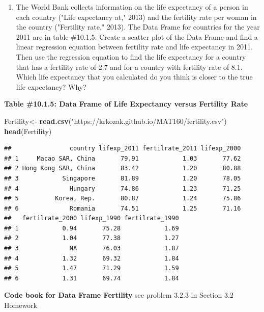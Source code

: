 \documentclass[]{book}
\newenvironment{Shaded}{\begin{snugshade}}{\end{snugshade}}
\newcommand{\KeywordTok}[1]{\textcolor[rgb]{0.13,0.29,0.53}{\textbf{#1}}}
\newcommand{\NormalTok}[1]{#1}
\newcommand{\StringTok}[1]{\textcolor[rgb]{0.31,0.60,0.02}{#1}}
\providecommand{\tightlist}{%
  \setlength{\itemsep}{0pt}\setlength{\parskip}{0pt}}
\begin{document}
\begin{enumerate}
\def\labelenumi{\arabic{enumi}.}
\setcounter{enumi}{2}
\tightlist
\item
  The World Bank collects information on the life expectancy of a person in each country ("Life expectancy at," 2013) and the fertility rate per woman in the country ("Fertility rate," 2013). The Data Frame for countries for the year 2011 are in table \#10.1.5. Create a scatter plot of the Data Frame and find a linear regression equation between fertility rate and life expectancy in 2011. Then use the regression equation to find the life expectancy for a country that has a fertility rate of 2.7 and for a country with fertility rate of 8.1. Which life expectancy that you calculated do you think is closer to the true life expectancy? Why?
\end{enumerate}

\textbf{Table \#10.1.5: Data Frame of Life Expectancy versus Fertility Rate}

\begin{Shaded}
\begin{Highlighting}[]
\NormalTok{Fertility<-}\StringTok{ }\KeywordTok{read.csv}\NormalTok{(}\StringTok{"https://krkozak.github.io/MAT160/fertility.csv"}\NormalTok{)}
\KeywordTok{head}\NormalTok{(Fertility)}
\end{Highlighting}
\end{Shaded}

\begin{verbatim}
##                country lifexp_2011 fertilrate_2011 lifexp_2000
## 1     Macao SAR, China       79.91            1.03       77.62
## 2 Hong Kong SAR, China       83.42            1.20       80.88
## 3            Singapore       81.89            1.20       78.05
## 4              Hungary       74.86            1.23       71.25
## 5          Korea, Rep.       80.87            1.24       75.86
## 6              Romania       74.51            1.25       71.16
##   fertilrate_2000 lifexp_1990 fertilrate_1990
## 1            0.94       75.28            1.69
## 2            1.04       77.38            1.27
## 3              NA       76.03            1.87
## 4            1.32       69.32            1.84
## 5            1.47       71.29            1.59
## 6            1.31       69.74            1.84
\end{verbatim}

\textbf{Code book for Data Frame Fertility} see problem 3.2.3 in Section 3.2 Homework
\end{document}
